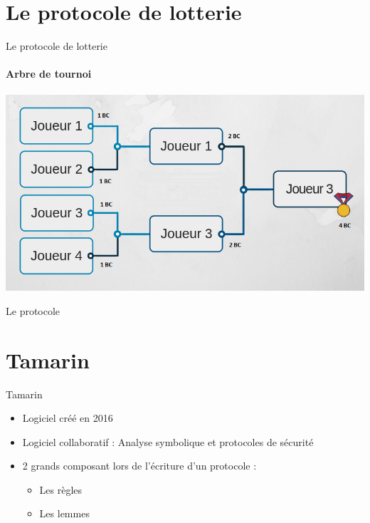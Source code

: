 \documentclass[french]{beamer}
\begin{document}
\section{Le protocole de lotterie}
\begin{frame}{Le protocole de lotterie} 
\framesubtitle{Arbre de tournoi}
\centering
\includegraphics[scale=0.5]{arbre-tournoi.png}\\
\end{frame}

\begin{frame}{Le protocole}

\end{frame}



\section{Tamarin}
\begin{frame}{Tamarin}
\begin{itemize}
    \item Logiciel créé en 2016
    \item Logiciel collaboratif : Analyse symbolique et protocoles de sécurité
    \item 2 grands composant lors de l'écriture d'un protocole :
    \begin{itemize}
        \item Les règles 
        \item Les lemmes
    \end{itemize}
\end{itemize}
\end{frame}
\end{document}
